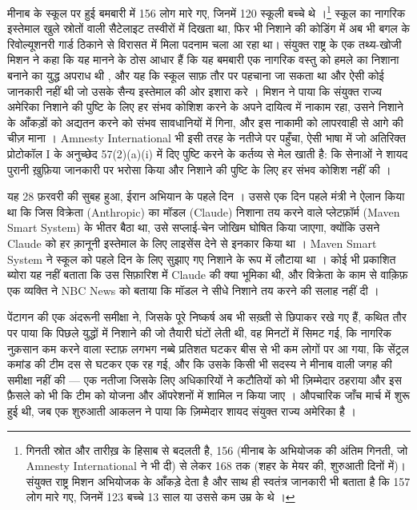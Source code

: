 मीनाब के स्कूल पर हुई बमबारी में 156 लोग मारे गए, जिनमें 120 स्कूली बच्चे थे \autocite[पैरा~92]{UNFFMIran2026}।\footnote{गिनती स्रोत और तारीख़ के हिसाब से बदलती है, 156 (मीनाब के अभियोजक की अंतिम गिनती, जो Amnesty International ने भी दी) से लेकर 168 तक (शहर के मेयर की, शुरुआती दिनों में)। संयुक्त राष्ट्र मिशन अभियोजक के आँकड़े देता है और साथ ही स्वतंत्र जानकारी भी बताता है कि 157 लोग मारे गए, जिनमें 123 बच्चे 13 साल या उससे कम उम्र के थे \autocite[पैरा~92–93]{UNFFMIran2026}।} स्कूल का नागरिक इस्तेमाल खुले स्रोतों वाली सैटेलाइट तस्वीरों में दिखता था, फिर भी निशाने की कोडिंग में अब भी बगल के रिवोल्यूशनरी गार्ड ठिकाने से विरासत में मिला पदनाम चला आ रहा था। संयुक्त राष्ट्र के एक तथ्य-खोजी मिशन ने कहा कि यह मानने के ठोस आधार हैं कि यह बमबारी एक नागरिक वस्तु को हमले का निशाना बनाने का युद्ध अपराध थी \autocite{ohchr2026minabpress}, और यह कि स्कूल साफ़ तौर पर पहचाना जा सकता था और ऐसी कोई जानकारी नहीं थी जो उसके सैन्य इस्तेमाल की ओर इशारा करे \autocite[पैरा~81–86, 124–126]{UNFFMIran2026}। मिशन ने पाया कि संयुक्त राज्य अमेरिका निशाने की पुष्टि के लिए हर संभव कोशिश करने के अपने दायित्व में नाकाम रहा, उसने निशाने के आँकड़ों को अद्यतन करने को संभव सावधानियों में गिना, और इस नाकामी को लापरवाही से आगे की चीज़ माना \autocite[पैरा~124–125]{UNFFMIran2026}। Amnesty International भी इसी तरह के नतीजे पर पहुँचा, ऐसी भाषा में जो अतिरिक्त प्रोटोकॉल I के अनुच्छेद 57(2)(a)(i) में दिए पुष्टि करने के कर्तव्य से मेल खाती है: कि सेनाओं ने शायद पुरानी ख़ुफ़िया जानकारी पर भरोसा किया और निशाने की पुष्टि के लिए हर संभव कोशिश नहीं की \autocite{Amnesty2026Minab}।

यह 28 फ़रवरी की सुबह हुआ, ईरान अभियान के पहले दिन \autocite{Amnesty2026Minab,crs2026iranwar}। उससे एक दिन पहले मंत्री ने ऐलान किया था कि जिस विक्रेता (Anthropic) का मॉडल (Claude) निशाना तय करने वाले प्लेटफ़ॉर्म (Maven Smart System) के भीतर बैठा था, उसे सप्लाई-चेन जोखिम घोषित किया जाएगा, क्योंकि उसने Claude को हर क़ानूनी इस्तेमाल के लिए लाइसेंस देने से इनकार किया था \autocite{npr2026openai}। Maven Smart System ने स्कूल को पहले दिन के लिए सुझाए गए निशाने के रूप में लौटाया था \autocite{livingstone2026maven,gizmodo2026minab}। कोई भी प्रकाशित ब्योरा यह नहीं बताता कि उस सिफ़ारिश में Claude की क्या भूमिका थी, और विक्रेता के काम से वाक़िफ़ एक व्यक्ति ने NBC News को बताया कि मॉडल ने सीधे निशाने तय करने की सलाह नहीं दी \autocite{nbc2026targeting}।

पेंटागन की एक अंदरूनी समीक्षा ने, जिसके पूरे निष्कर्ष अब भी सख़्ती से छिपाकर रखे गए हैं, कथित तौर पर पाया कि पिछले युद्धों में निशाने की जो तैयारी घंटों लेती थी, वह मिनटों में सिमट गई, कि नागरिक नुक़सान कम करने वाला स्टाफ़ लगभग नब्बे प्रतिशत घटकर बीस से भी कम लोगों पर आ गया, कि सेंट्रल कमांड की टीम दस से घटकर एक रह गई, और कि उसके किसी भी सदस्य ने मीनाब वाली जगह की समीक्षा नहीं की — एक नतीजा जिसके लिए अधिकारियों ने कटौतियों को भी ज़िम्मेदार ठहराया और इस फ़ैसले को भी कि टीम को योजना और ऑपरेशनों में शामिल न किया जाए \autocite{Bloomberg2026KillChain}। औपचारिक जाँच मार्च में शुरू हुई थी, जब एक शुरुआती आकलन ने पाया कि ज़िम्मेदार शायद संयुक्त राज्य अमेरिका है \autocite{NPR2026MinabProbe}।

